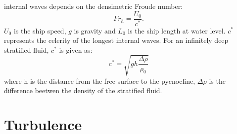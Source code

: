 \documentclass[a4paper, 12pt]{report}
\begin{document}
internal waves depends on the densimetric Froude number:
\begin{equation}
Fr_h = \frac{U_0}{c^*}.
\label{eqn:densimetricFroudeNumber}
\end{equation}
$U_0$ is the ship speed, $g$ is gravity and $L_0$ is the ship length at water level. $c^*$ represents the celerity of the longest internal waves. For an infinitely deep stratified fluid, $c^*$ is given as:
\begin{equation}
c^* = \sqrt{gh\frac{\Delta \rho}{\rho_0}}
\label{eqn:celerityWaves}
\end{equation} 
where h is the distance from the free surface to the pycnocline, $\Delta \rho$ is the difference beetwen the density of the stratified fluid.
\section{Turbulence}
\end{document}
